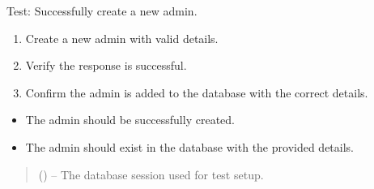 \documentclass[letterpaper,10pt,english]{sphinxmanual}
\begin{document}

\begin{fulllineitems}
\label{\detokenize{test:test.test_admin.test_create_admin_success}}
\pysigstartsignatures
\pysiglinewithargsret
{}
{}
{}
\pysigstopsignatures
\sphinxAtStartPar
Test: Successfully create a new admin.
\begin{description}
\begin{enumerate}
%
\item {} 
\sphinxAtStartPar
Create a new admin with valid details.

\item {} 
\sphinxAtStartPar
Verify the response is successful.

\item {} 
\sphinxAtStartPar
Confirm the admin is added to the database with the correct details.

\end{enumerate}

\begin{itemize}
\item {} 
\sphinxAtStartPar
The admin should be successfully created.

\item {} 
\sphinxAtStartPar
The admin should exist in the database with the provided details.

\end{itemize}

\end{description}
\begin{quote}\begin{description}
\sphinxAtStartPar
{} () – The database session used for test setup.

\end{description}\end{quote}

\end{fulllineitems}

\end{document}
